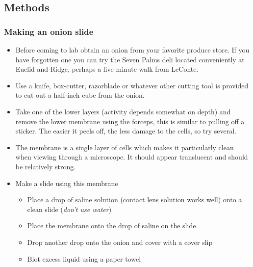 \documentclass{../lab}
\begin{document}
\subsection{Methods}

\subsubsection{Making an onion slide}

\begin{itemize}
    \item Before coming to lab obtain an onion from your favorite produce store. If you have forgotten one you can try the Seven Palms deli located conveniently at Euclid and Ridge, perhaps a five minute walk from LeConte.

    \item Use a knife, box-cutter, razorblade or whatever other cutting tool is provided to cut out a half-inch cube from the onion.

    \item Take one of the lower layers (activity depends somewhat on depth) and remove the lower membrane using the forceps, this is similar to pulling off a sticker. The easier it peels off, the less damage to the cells, so try several.

    \item The membrane is a single layer of cells which makes it particularly clean when viewing through a microscope. It should appear translucent and should be relatively strong.

    \item Make a slide using this membrane

    \begin{itemize}
        \item Place a drop of saline solution (contact lens solution works well) onto a clean slide (\emph{don't use water})

        \item Place the membrane onto the drop of saline on the slide

        \item Drop another drop onto the onion and cover with a cover slip

        \item Blot excess liquid using a paper towel

    \end{itemize}
    
\newpage


\end{itemize}
\end{document}
